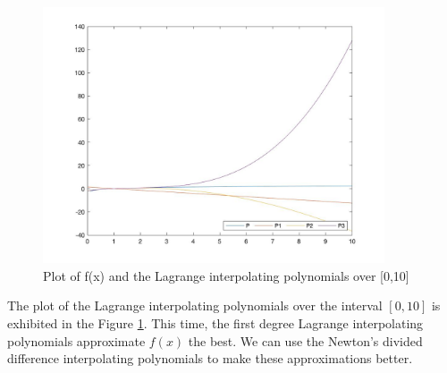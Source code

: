 \begin{answer}
    \begin{figure}[H]
        \centering
        \includegraphics[width=0.9\textwidth]{Figure 6.jpg}
        \caption{\label{fig:fig6}Plot of f(x) and the Lagrange interpolating polynomials over [0,10]}
    \end{figure}
    The plot of the Lagrange interpolating polynomials over the interval $[0,10]$ is exhibited in the Figure \ref{fig:fig6}. This time, the first degree Lagrange interpolating polynomials approximate $f(x)$ the best. We can use the Newton's divided difference interpolating polynomials to make these approximations better.
\end{answer}